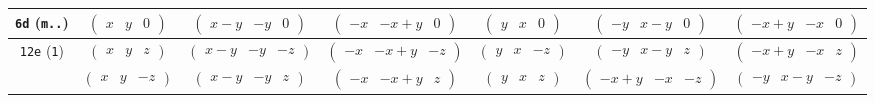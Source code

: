 \documentclass[fleqn,9pt,landscape]{jsarticle}
\begin{document}
\begin{center}
\begin{longtable}{ccccccc}
{\tt 6d} ({\tt m..}) & $ \begin{pmatrix} x & y & 0 \end{pmatrix} $ & $ \begin{pmatrix} x - y & - y & 0 \end{pmatrix} $ & $ \begin{pmatrix} - x & - x + y & 0 \end{pmatrix} $ & $ \begin{pmatrix} y & x & 0 \end{pmatrix} $ & $ \begin{pmatrix} - y & x - y & 0 \end{pmatrix} $ & $ \begin{pmatrix} - x + y & - x & 0 \end{pmatrix} $ \\ \hline
{\tt 12e} ({\tt 1}) & $ \begin{pmatrix} x & y & z \end{pmatrix} $ & $ \begin{pmatrix} x - y & - y & - z \end{pmatrix} $ & $ \begin{pmatrix} - x & - x + y & - z \end{pmatrix} $ & $ \begin{pmatrix} y & x & - z \end{pmatrix} $ & $ \begin{pmatrix} - y & x - y & z \end{pmatrix} $ & $ \begin{pmatrix} - x + y & - x & z \end{pmatrix} $ \\
& $ \begin{pmatrix} x & y & - z \end{pmatrix} $ & $ \begin{pmatrix} x - y & - y & z \end{pmatrix} $ & $ \begin{pmatrix} - x & - x + y & z \end{pmatrix} $ & $ \begin{pmatrix} y & x & z \end{pmatrix} $ & $ \begin{pmatrix} - x + y & - x & - z \end{pmatrix} $ & $ \begin{pmatrix} - y & x - y & - z \end{pmatrix} $ \\
\end{longtable}
\end{center}
\end{document}
